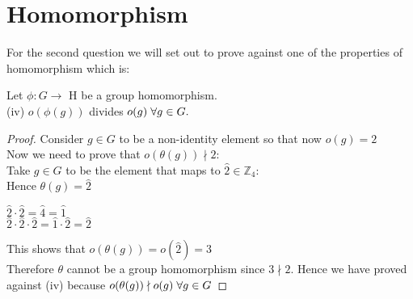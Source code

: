 \documentclass[,oneside]{article}
\numberwithin{equation}{section}
\newcommand{\Z}{\mathbb{Z}}
\begin{document}
\section{Homomorphism}
For the second question we will set out to prove against one of the properties of homomorphism which is:
\begin{center}
Let $\phi: G \rightarrow$ H be a group homomorphism.\\
(iv) $o(\phi(g))$ divides $o(g) \hspace{0.1cm}\forall g \in G.$
\end{center}
\begin{proof}
Consider $g \in G$ to be a non-identity element so that now $o(g)=2$\\
Now we need to prove that $o(\theta(g)) \nmid 2$:\\
Take $g \in G$ to be the element that maps to $\hat{2} \in \Z_4$:\\
Hence $\theta(g)=\hat{2}$
\begin{center}
$\hat{2} \cdot \hat{2} = \hat{4} = \hat{1}$ \\
$\hat{2} \cdot \hat{2} \cdot \hat{2} = \hat{1} \cdot \hat{2} = \hat{2}$
\end{center}
This shows that $o(\theta(g)) = o(\hat{2}) = 3$\\
Therefore $\theta$ cannot be a group homomorphism since $3 \nmid 2$. Hence we have proved against (iv) because $o(\theta(g)) \nmid o(g) \hspace{0.1cm} \forall g \in G$
\end{proof}
\end{document}
